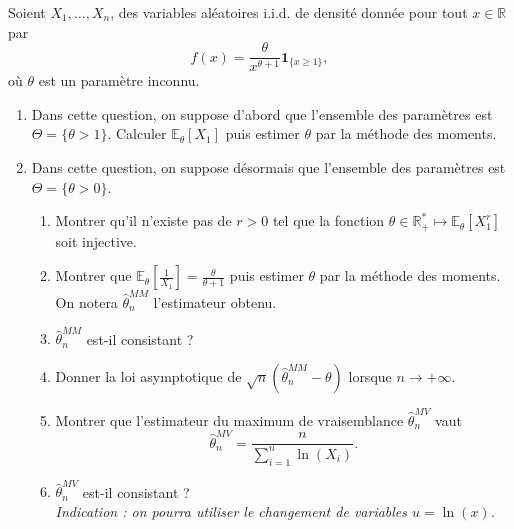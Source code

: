 \begin{mdframed}
\begin{exercice}
Soient $X_1, \dots, X_n$, des variables aléatoires i.i.d. de densité donnée pour tout $x \in \mathbb{R}$ par
\begin{equation*}
f(x) = \frac{\theta}{x^{\theta+1}} \mathbf{1}_{\{x \ge 1\}},
\end{equation*}
où $\theta$ est un paramètre inconnu.

\begin{enumerate}
    \item Dans cette question, on suppose d'abord que l'ensemble des paramètres est $\Theta = \{\theta > 1\}$. Calculer $\mathbb{E}_\theta[X_1]$ puis estimer $\theta$ par la méthode des moments.
    \item Dans cette question, on suppose désormais que l'ensemble des paramètres est $\Theta = \{\theta > 0\}$.
    \begin{enumerate}
        \item[i--] Montrer qu'il n'existe pas de $r > 0$ tel que la fonction $\theta \in \mathbb{R}_+^* \mapsto \mathbb{E}_\theta[X_1^r]$ soit injective.
        \item[ii--] Montrer que $\mathbb{E}_\theta\left[ \frac{1}{X_1} \right] = \frac{\theta}{\theta+1}$ puis estimer $\theta$ par la méthode des moments. On notera $\hat{\theta}_n^{MM}$ l'estimateur obtenu.
        \item[iii--] $\hat{\theta}_n^{MM}$ est-il consistant ?
        \item[iv--] Donner la loi asymptotique de $\sqrt{n}(\hat{\theta}_n^{MM} - \theta)$ lorsque $n \to +\infty$.
        \item[v--] Montrer que l'estimateur du maximum de vraisemblance $\hat{\theta}_n^{MV}$ vaut
        \begin{equation*}
        \hat{\theta}_n^{MV} = \frac{n}{\sum_{i=1}^n \ln(X_i)}.
        \end{equation*}
        \item[vi--] $\hat{\theta}_n^{MV}$ est-il consistant ?\\
        \textit{Indication : on pourra utiliser le changement de variables $u = \ln(x)$.}
    \end{enumerate}
\end{enumerate}
\end{exercice}
\end{mdframed}

\smallskip

